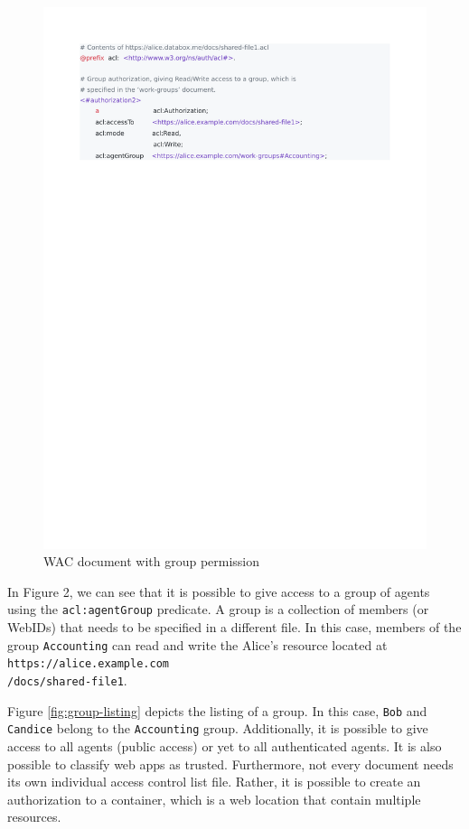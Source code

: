 \documentclass[sigconf]{acmart}
\def\code#1{\texttt{#1}}
\begin{document}
\begin{figure}
  \includegraphics[trim=2cm 21.2cm 4.7cm 2cm, clip, scale=0.57]{pdf/shared-file1}
  \caption{WAC document with group permission}
  \label{fig:group-permission}
\end{figure}

In Figure 2, we can see that it is possible to give access to a group of agents using the \code{acl:agentGroup} predicate. A group is a collection of members (or WebIDs) that needs to be specified in a different file. In this case, members of the group \code{Accounting} can read and write the Alice's resource located at \code{https://alice.example.com\\/docs/shared-file1}.

 Figure \ref{fig:group-listing} depicts the listing of a group. In this case, \code{Bob} and \code{Candice} belong to the \code{Accounting} group. Additionally, it is possible to give access to all agents (public access) or yet to all authenticated agents. It is also possible to classify web apps as trusted. Furthermore, not every document needs its own individual access control list file. Rather, it is possible to create an authorization to a container, which is a web location that contain multiple resources.
\end{document}
